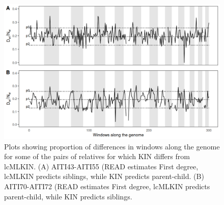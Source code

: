 \documentclass[12pt, letterpaper]{article}
\begin{document}
\begin{figure}[h]
    \centering
    \includegraphics[width=18cm]{supplementary_info/plots/egplot2.png}
    \caption{Plots showing proportion of differences in windows along the genome for some of the pairs of relatives for which KIN differs from lcMLKIN. (A) AITI43-AITI55 (READ estimates First degree, lcMLKIN predicts siblings, while KIN predicts parent-child. (B) AITI70-AITI72 (READ estimates First degree, lcMLKIN predicts parent-child, while KIN predicts siblings.}
    \label{figS9:eg2}
\end{figure}



\end{document}
